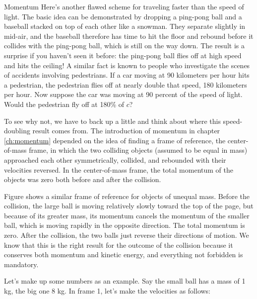 %
\begin{envsubsection}{Momentum}
Here's another flawed scheme for traveling faster than the speed of light.
The basic idea can be demonstrated by dropping a ping-pong ball and a baseball
stacked on top of each other like a snowman. They separate slightly in mid-air,
and the baseball therefore has time to hit the floor and rebound before it
collides with the ping-pong ball, which is still on the way down. The result is
a surprise if you haven't seen it before: the ping-pong ball flies off at high
speed and hits the ceiling! A similar fact is known to people who investigate the
scenes of accidents involving pedestrians. If a car moving at 90 kilometers per
hour hits a pedestrian, the pedestrian flies off at nearly double that speed, 180
kilometers per hour. Now suppose the car was moving at 90 percent of the speed of
light. Would the pedestrian fly off at 180\% of $c$?

To see why not, we have to back up a little and think about where this speed-doubling
result comes from. The introduction of momentum in chapter \ref{ch:momentum} depended
on the idea of finding a frame of reference, the center-of-mass frame, in which the
two colliding objects (assumed to be equal in mass) approached each other symmetrically,
collided, and rebounded with their velocities reversed. In the center-of-mass frame,
the total momentum of the objects was zero both before and after the collision.


Figure  shows a similar frame of reference for objects of unequal mass.
Before the collision, the large ball is moving relatively slowly toward the top of the page, but
because of its greater mass, its momentum cancels the momentum of the smaller ball, which is
moving rapidly in the opposite direction. The total momentum is zero. After the collision, the
two balls just reverse their directions of motion. We know that this is the
right result for the outcome of the collision because
it conserves both momentum and kinetic energy, and everything not forbidden is mandatory.


Let's make up some numbers as an example. Say the small ball has a mass of 1 kg, the big
one 8 kg. In frame 1, let's make the velocities as follows:


\end{envsubsection}
